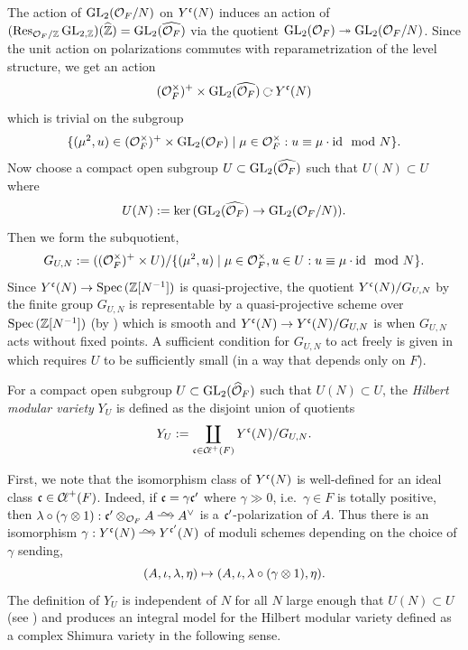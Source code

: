 \documentclass[main.tex]{subfiles}
\begin{document}
The action of $\mathrm{GL}_2(\mathcal{O}_F/N)$ on $Y^{\mathfrak{c}}(N)$ induces an action of $(\operatorname{\mathrm{Res}}_{\mathcal{O}_F/\mathbb{Z}} \mathrm{GL}_{2,\mathbb{Z}})(\widehat{\mathbb{Z}}) = \mathrm{GL}_2(\widehat{\mathcal{O}_F})$ via the quotient $\mathrm{GL}_2(\mathcal{O}_F) \twoheadrightarrow \mathrm{GL}_2(\mathcal{O}_F/N)$. Since the unit action on polarizations commutes with reparametrization of the level structure, we get an action
\[ (\cO_F^\times)^+ \times \GL_2(\widehat{\cO_F}) \acts Y^{\cc}(N) \]
which is trivial on the subgroup 
\[ \{ (\mu^2, u) \in (\mathcal{O}_F^\times)^+ \times \mathrm{GL}_2(\mathcal{O}_F) \mid \mu \in \mathcal{O}_F^\times : u \equiv \mu \cdot \mathrm{id} \mod N \}. \]
Now choose a compact open subgroup $U \subset \mathrm{GL}_2(\widehat{\mathcal{O}_F})$ such that $U(N) \subset U$ where
\[ U(N) := \ker{(\mathrm{GL}_2(\widehat{\mathcal{O}_F}) \to \mathrm{GL}_2(\mathcal{O}_F/N))}. \]
Then we form the subquotient,
\[ G_{U,N} := ((\mathcal{O}_F^\times)^+ \times U) / \{ (\mu^2, u) \mid \mu \in \mathcal{O}_F^\times, u \in U : u \equiv \mu \cdot \mathrm{id} \mod N \}. \]
Since $Y^{\mathfrak{c}}(N) \to \operatorname{\mathrm{Spec}}{(\mathbb{Z}[N^{-1}])}$ is quasi-projective, the quotient $Y^{\mathfrak{c}}(N) / G_{U,N}$ by the finite group $G_{U,N}$ is representable by a quasi-projective scheme over $\operatorname{\mathrm{Spec}}{(\mathbb{Z}[N^{-1}])}$ (by \cite[Prop.V.1.8]{SGA1}) which is smooth and $Y^{\mathfrak{c}}(N) \to Y^{\mathfrak{c}}(N) / G_{U,N}$ is \etale when $G_{U,N}$ acts without fixed points. A sufficient condition for $G_{U,N}$ to act freely is given in \cite[Lemma~2.4.1]{diamond:serre_weight} which requires $U$ to be sufficiently small (in a way that depends only on $F$). 

\begin{defn}
For a compact open subgroup $U \subset \mathrm{GL}_2(\widehat{\mathcal{O}}_F)$ such that $U(N) \subset U$, the \textit{Hilbert modular variety} $Y_U$ is defined as the disjoint union of quotients
\[ Y_U := \coprod_{\mathfrak{c} \in \operatorname{\mathcal{C}\!{\ell}}^+(F)} Y^{\mathfrak{c}}(N) / G_{U,N}. \]
\end{defn}

First, we note that the isomorphism class of $Y^{\mathfrak{c}}(N)$ is well-defined for an ideal class $\mathfrak{c} \in \operatorname{\mathcal{C}\!{\ell}}^+(F)$. Indeed, if $\mathfrak{c} = \gamma \mathfrak{c}'$ where $\gamma \gg 0$, i.e.\ $\gamma \in F$ is totally positive, then $\lambda \circ (\gamma \ot 1) : \cc' \ot_{\cO_F} A \iso A^{\vee}$ is a $\mathfrak{c}'$-polarization of $A$. Thus there is an isomorphism $\gamma : Y^{\cc}(N) \iso Y^{\cc'}(N)$ of moduli schemes depending on the choice of $\gamma$ sending,
\[ (A, \iota, \lambda, \eta) \mapsto (A, \iota, \lambda \circ (\gamma \otimes 1), \eta). \]
The definition of $Y_U$ is independent of $N$ for all $N$ large enough that $U(N) \subset U$ 
(see \cite[\S~2.5.]{diamond:serre_weight}) and produces an integral model for the Hilbert modular variety defined as a complex Shimura variety in the following sense.
\end{document}
